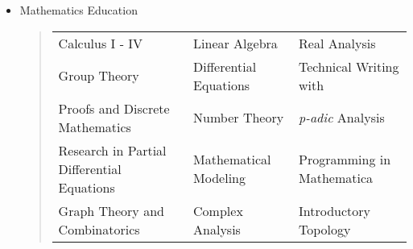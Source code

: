\begin{enumerate}[label={\Roman*}.]
\begin{itemize}
\begin{itemize}
\begin{quote}
\begin{tabular}{l l l l}
	      	      	      	\end{tabular}
	      	      	      \end{quote}
	      	      	\item Mathematics Education
	      	      	      \begin{quote}
	      	      	      	\def\arraystretch{1.1}
	      	      	      	\begin{tabular}{l l l}
	      	      	      		Calculus I - IV                            & Linear Algebra         & Real Analysis                         \\
	      	      	      		Group Theory                               & Differential Equations & Technical Writing with \hologo{LaTeX} \\
	      	      	      		Proofs and Discrete Mathematics            & Number Theory          & \textit{p-adic} Analysis              \\
	      	      	      		Research in Partial Differential Equations & Mathematical Modeling  & Programming in Mathematica\\
								Graph Theory and Combinatorics & Complex Analysis & Introductory Topology
	      	      	      	\end{tabular}
	      	      	      \end{quote}
	      	      \end{itemize}
	      \end{itemize}
\end{enumerate}
